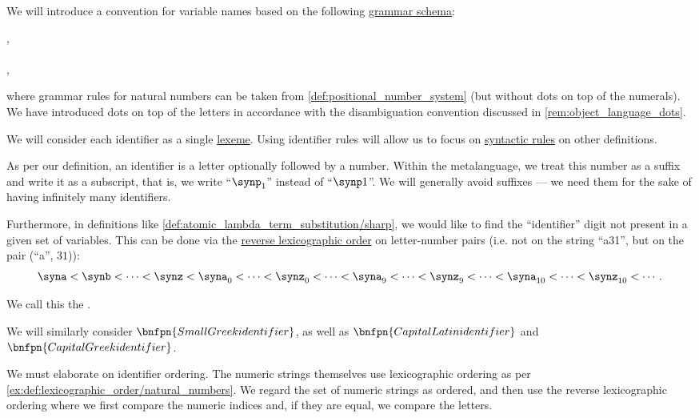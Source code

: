 \begin{definition}\label{def:variable_identifier}\mimprovised
  We will introduce a convention for variable names based on the following \hyperref[def:formal_grammar/schema]{grammar schema}:
  \begin{bnf*}
         {\bnftsq{\( \syna \)} \bnfor \bnftsq{\( \synb \)} \bnfor \cdots \bnfor \bnftsq{\( \syny \)} \bnfor \bnftsq{\( \synz \)}}, \\
     { \bnfor} \\
    , \\
  \end{bnf*}
  where grammar rules for natural numbers can be taken from \cref{def:positional_number_system} (but without dots on top of the numerals). We have introduced dots on top of the letters in accordance with the disambiguation convention discussed in \cref{rem:object_language_dots}.

  We will consider each identifier as a single \hyperref[con:abstract_syntax_tree/lexical]{lexeme}. Using identifier rules will allow us to focus on \hyperref[con:abstract_syntax_tree/syntactic]{syntactic rules} on other definitions.

  As per our definition, an identifier is a letter optionally followed by a number. Within the metalanguage, we treat this number as a suffix and write it as a subscript, that is, we write \enquote{\( \synp_1 \)} instead of \enquote{\( \synp1 \)}. We will generally avoid suffixes --- we need them for the sake of having infinitely many identifiers.

  Furthermore, in definitions like \cref{def:atomic_lambda_term_substitution/sharp}, we would like to find the \enquote{identifier} digit not present in a given set of variables. This can be done via the \hyperref[thm:def:well_ordered_set/lexicographic]{reverse lexicographic order} on letter-number pairs (i.e. not on the string \enquote{a31}, but on the pair (\enquote{a}, \( 31 \))):
  \begin{equation*}
    \syna < \synb < \cdots < \synz < \syna_0 < \cdots < \synz_0 < \cdots < \syna_9 < \cdots < \synz_9 < \cdots < \syna_{10} < \cdots < \synz_{10} < \cdots.
  \end{equation*}

  We call this the .

  We will similarly consider \( \bnfpn{Small Greek identifier} \), as well as \( \bnfpn{Capital Latin identifier} \) and \( \bnfpn{Capital Greek identifier} \).
\end{definition}
\begin{comments}
  \item We must elaborate on identifier ordering. The numeric strings themselves use lexicographic ordering as per \cref{ex:def:lexicographic_order/natural_numbers}. We regard the set of numeric strings as ordered, and then use the reverse lexicographic ordering where we first compare the numeric indices and, if they are equal, we compare the letters.
\end{comments}

